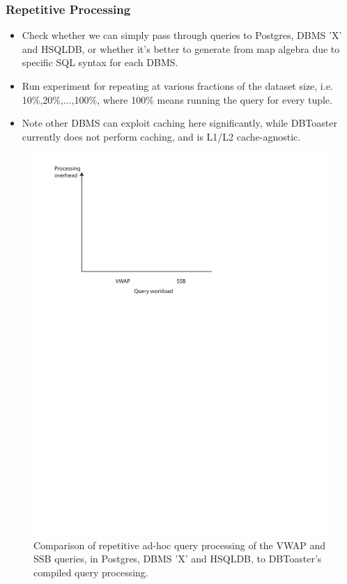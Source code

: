 {\subsubsection{Repetitive Processing}
\begin{itemize}
\item Check whether we can simply pass through queries to Postgres, DBMS 'X' and
  HSQLDB, or whether it's better to generate from map algebra due to specific
  SQL syntax for each DBMS.
\item Run experiment for repeating at various fractions of the dataset size,
  i.e. 10\%,20\%,...,100\%, where 100\% means running the query for every tuple.
\item Note other DBMS can exploit caching here significantly, while DBToaster
  currently does not perform caching, and is L1/L2 cache-agnostic.
\end{itemize}

\begin{figure}
\includegraphics[scale=0.6]{figures/axes-repetitive.pdf}
\caption{Comparison of repetitive ad-hoc query processing of the VWAP and SSB
queries, in Postgres, DBMS 'X' and HSQLDB, to DBToaster's compiled query
processing.}
\label{fig:overhead-repetition}
\end{figure}

}
